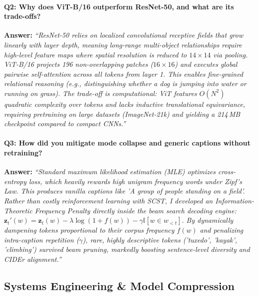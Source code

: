 \documentclass[11pt,a4paper]{article}
\begin{document}
\paragraph{Q2: Why does ViT-B/16 outperform ResNet-50, and what are its trade-offs?}
\textbf{Answer:} 
\textit{``ResNet-50 relies on localized convolutional receptive fields that grow linearly with layer depth, meaning long-range multi-object relationships require high-level feature maps where spatial resolution is reduced to $14 \times 14$ via pooling. ViT-B/16 projects 196 non-overlapping patches ($16 \times 16$) and executes global pairwise self-attention across all tokens from layer 1. This enables fine-grained relational reasoning (e.g., distinguishing whether a dog is jumping into water or running on grass). The trade-off is computational: ViT features $O(N^2)$ quadratic complexity over tokens and lacks inductive translational equivariance, requiring pretraining on large datasets (ImageNet-21k) and yielding a 214\,MB checkpoint compared to compact CNNs.''}

\paragraph{Q3: How did you mitigate mode collapse and generic captions without retraining?}
\textbf{Answer:} 
\textit{``Standard maximum likelihood estimation (MLE) optimizes cross-entropy loss, which heavily rewards high unigram frequency words under Zipf's Law. This produces vanilla captions like 'A group of people standing on a field'. Rather than costly reinforcement learning with SCST, I developed an Information-Theoretic Frequency Penalty directly inside the beam search decoding engine:
$\mathbf{z}_t'(w) = \mathbf{z}_t(w) - \lambda \log(1 + f(w)) - \gamma \mathbb{I}[w \in w_{<t}]$.
By dynamically dampening tokens proportional to their corpus frequency $f(w)$ and penalizing intra-caption repetition ($\gamma$), rare, highly descriptive tokens ('tuxedo', 'kayak', 'climbing') survived beam pruning, markedly boosting sentence-level diversity and CIDEr alignment.''}

\subsection{Systems Engineering \& Model Compression}
\end{document}
